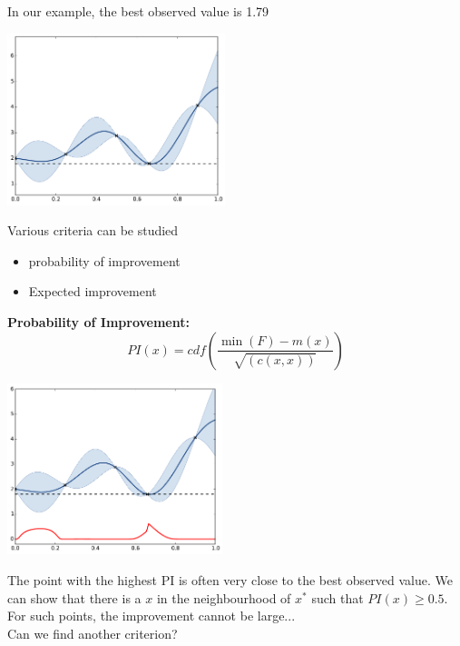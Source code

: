 \begin{frame}{}
In our example, the best observed value is 1.79
\begin{center}
\includegraphics[height=5cm]{4_optimization/figures/python/ego_improv}
\end{center}
Various criteria can be studied
\begin{itemize}
	\item probability of improvement
	\item Expected improvement
\end{itemize}
\end{frame}

\begin{frame}{}
\textbf{Probability of Improvement:}
$$PI(x) = cdf \left(\frac{\min(F) - m(x)}{\sqrt{(c(x,x))}} \right)$$
\begin{center}
\includegraphics[height=5cm]{4_optimization/figures/python/ego_PI}
\end{center}
\end{frame}

\begin{frame}{}
The point with the highest PI is often very close to the best observed value. We can show that there is a $x$ in the neighbourhood of $x^*$ such that $PI(x) \geq 0.5$.\\
\vspace{5mm}
For such points, the improvement cannot be large... \\
\vspace{3mm}
Can we find another criterion?
\end{frame}

